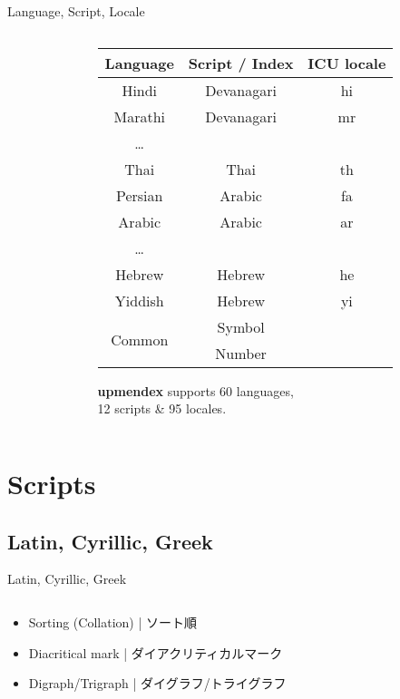 \documentclass[aspectratio=169,10pt]{beamer}
\begin{document}
\begin{frame}[fragile]{Language, Script, Locale}
\begin{columns}
\begin{column}{70mm}
\begin{center}
\end{center}
\end{column}
\begin{column}{58mm}
\footnotesize
\begin{center}
\begin{tabular}{ccc}
  Language  & Script / Index & ICU locale \\\hline\hline
  Hindi     & Devanagari     & hi             \\
  Marathi   & Devanagari     & mr             \\
  \ldots    &                &                \\\hdashline
  Thai      & Thai           & th             \\\hline
  Persian   & Arabic         & fa             \\
  Arabic    & Arabic         & ar             \\
  \ldots    &                &                \\\hdashline
  Hebrew    & Hebrew         & he             \\
  Yiddish   & Hebrew         & yi             \\\hline
  \multirow{2}{*}{Common}  & Symbol   &       \\
            & Number         &                \\\hline
\end{tabular}
\end{center}
\vspace{2mm}
\normalsize
\textbf{upmendex} supports 60 languages,\\12 scripts \& 95 locales.
\end{column}
\end{columns}
\end{frame}


\section{Scripts}
\subsection{Latin, Cyrillic, Greek}
\begin{frame}{Latin, Cyrillic, Greek}
\begin{columns}
\begin{column}{120mm}
\begin{center}
\large
  \begin{itemize}
    \item Sorting (Collation) | ソート順
    \item Diacritical mark | ダイアクリティカルマーク
    \item Digraph/Trigraph | ダイグラフ/トライグラフ
  \end{itemize}
\end{center}
\end{column}
\end{columns}
\end{frame}
\end{document}
